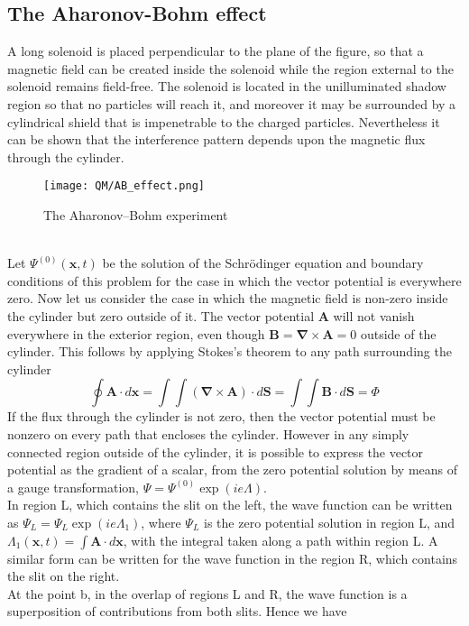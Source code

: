 \subsection{The Aharonov-Bohm effect}
A long solenoid is placed perpendicular to the plane of the figure, so that a magnetic field can be created inside the solenoid while the region external to the solenoid remains field-free. The solenoid is located in the unilluminated shadow region so that no particles will reach it, and moreover it may be surrounded by a cylindrical shield that is impenetrable to the charged particles. Nevertheless it can be shown that the interference pattern depends upon the magnetic flux through the cylinder.\\
\begin{figure}[!h]
	\centering
	\texttt{[image: QM/AB\_effect.png]}
	\caption{The Aharonov–Bohm experiment}
\end{figure}\\
Let $\Psi^{(0)}(\bm{x},t)$ be the solution of the Schrödinger equation and boundary conditions of this problem for the case in which the vector potential is everywhere zero. Now let us consider the case in which the magnetic field is non-zero inside the cylinder but zero outside of it. The vector potential $\bm{A}$ will not vanish everywhere in the exterior region, even though $\bm{B}=\bm{\nabla}\times\bm{A}=0$
outside of the cylinder. This follows by applying Stokes's theorem to any path surrounding the cylinder
\[\oint \bm{A}\cdot d\bm{x} = \int\int (\bm{\nabla}\times\bm{A})\cdot d\bm{S} = \int\int \bm{B}\cdot d\bm{S} = \Phi\]
If the flux through the cylinder is not zero, then the vector potential must be nonzero on every path that encloses the cylinder. However in any simply connected region outside of the cylinder, it is possible to express the vector potential as the gradient of a scalar, from the zero potential solution by means of a gauge transformation, $\Psi = \Psi^{(0)}\exp(ie\Lambda)$.
\\
In region L, which contains the slit on the left, the wave function can be written as $\Psi_L = \Psi_L\exp(ie\Lambda_1)$, where $\Psi_L$ is the zero potential solution in region L, and $\Lambda_1(\bm{x},t) = \int \bm{A}\cdot d\bm{x}$, with the integral taken along a path within region L. A similar form can be written for the wave function in the region R, which contains the slit on the right. \\
At the point b, in the overlap of regions L and R, the wave function is a superposition of contributions from both slits. Hence we have
